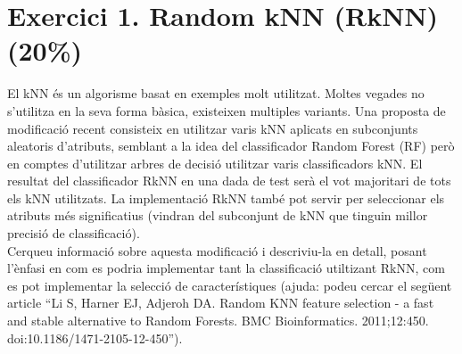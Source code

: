 \documentclass{article} %
\begin{document}
\section{Exercici 1. Random kNN (RkNN) (20\%)}
El kNN és un algorisme basat en exemples molt utilitzat. Moltes vegades no s'utilitza en la seva forma bàsica, existeixen multiples variants. Una proposta de modificació recent
consisteix en utilitzar varis kNN aplicats en subconjunts aleatoris d’atributs, semblant a la idea del classificador Random Forest (RF) però en comptes d’utilitzar arbres de decisió utilitzar varis classificadors kNN. El resultat del classificador RkNN en una dada de test serà el vot majoritari de tots els kNN utilitzats. La implementació RkNN també pot servir per seleccionar els atributs més significatius (vindran del subconjunt de kNN que tinguin millor
precisió de classificació). \\

Cerqueu informació sobre aquesta modificació i descriviu-la en detall, posant l’ènfasi en com es podria implementar tant la classificació utiltizant RkNN, com es pot implementar la selecció de característiques (ajuda: podeu cercar el següent article “Li S, Harner EJ, Adjeroh DA. Random KNN feature selection - a fast and stable alternative to Random Forests. BMC Bioinformatics. 2011;12:450. doi:10.1186/1471-2105-12-450”). \\
\end{document}
